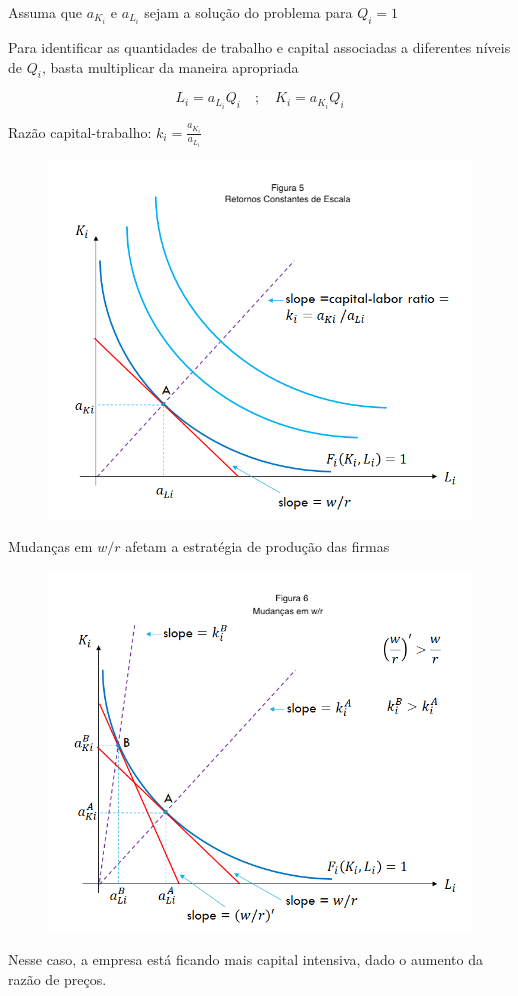 \documentclass[a4paper,12pt]{article}[abntex2]
\begin{document}
Assuma que \( a_{K_i} \) e \( a_{L_i} \) sejam a solução do problema para \( Q_i = 1 \)

Para identificar as quantidades de trabalho e capital associadas a diferentes níveis de \( Q_i \), basta multiplicar da maneira apropriada

\[
L_i = a_{L_i} Q_i \quad ; \quad K_i = a_{K_i} Q_i
\]

Razão capital-trabalho: \( k_i = \frac{a_{K_i}}{a_{L_i}} \)

\begin{figure}[H]
    \centering
    \includegraphics[width=0.7\linewidth]{Imagens/a10i5.png}
\end{figure}

Mudanças em \(w/r\) afetam a estratégia de produção das firmas

\begin{figure}[H]
    \centering
    \includegraphics[width=0.7\linewidth]{Imagens/a10i6.png}
\end{figure}

Nesse caso, a empresa está ficando mais capital intensiva, dado o aumento da razão de preços.
\end{document}
